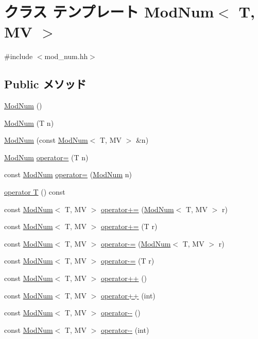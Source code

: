 \hypertarget{classModNum}{
\section{クラス テンプレート ModNum$<$ T, MV $>$}
\label{classModNum}
}


{\ttfamily \#include $<$mod\_\-num.hh$>$}\subsection*{Public メソッド}
\begin{DoxyCompactItemize}
\item 
\hyperlink{classModNum_a47ef790027a42be8a3b6ab6279c3f0cd}{ModNum} ()
\item 
\hyperlink{classModNum_a3d3f4e8f4467b44da989f147858e4539}{ModNum} (T n)
\item 
\hyperlink{classModNum_a6899810e3c6657d8e4b1e7d998be9b63}{ModNum} (const \hyperlink{classModNum}{ModNum}$<$ T, MV $>$ \&n)
\item 
\hyperlink{classModNum}{ModNum} \hyperlink{classModNum_ac9b0ecb5d93cd9ab63c0c4460ef102de}{operator=} (T n)
\item 
const \hyperlink{classModNum}{ModNum} \hyperlink{classModNum_aa1c55956ddf025b2b6a74d96a11fc4ae}{operator=} (\hyperlink{classModNum}{ModNum} n)
\item 
\hyperlink{classModNum_ae5857c1c44e69902576181d342c6b0cd}{operator T} () const 
\item 
const \hyperlink{classModNum}{ModNum}$<$ T, MV $>$ \hyperlink{classModNum_a82c9860a23c00bc0d2450c89fc1555f6}{operator+=} (\hyperlink{classModNum}{ModNum}$<$ T, MV $>$ r)
\item 
const \hyperlink{classModNum}{ModNum}$<$ T, MV $>$ \hyperlink{classModNum_a2f36d8f08eefc54772770f0593a7c07e}{operator+=} (T r)
\item 
const \hyperlink{classModNum}{ModNum}$<$ T, MV $>$ \hyperlink{classModNum_abe043451af83e140341074e14da1cf0b}{operator-\/=} (\hyperlink{classModNum}{ModNum}$<$ T, MV $>$ r)
\item 
const \hyperlink{classModNum}{ModNum}$<$ T, MV $>$ \hyperlink{classModNum_ac7d636a5f72a15f680d7ecc93a8848b3}{operator-\/=} (T r)
\item 
const \hyperlink{classModNum}{ModNum}$<$ T, MV $>$ \hyperlink{classModNum_a7948d9ce22cac88f035a1f54e4f0d538}{operator++} ()
\item 
const \hyperlink{classModNum}{ModNum}$<$ T, MV $>$ \hyperlink{classModNum_a28fee12666656f54437c465419e05853}{operator++} (int)
\item 
const \hyperlink{classModNum}{ModNum}$<$ T, MV $>$ \hyperlink{classModNum_ae86d1c5506399fd33b8dc9de5b6481ab}{operator-\/-\/} ()
\item 
const \hyperlink{classModNum}{ModNum}$<$ T, MV $>$ \hyperlink{classModNum_a768eff646e5c38f101a9b90532048964}{operator-\/-\/} (int)
\end{DoxyCompactItemize}
